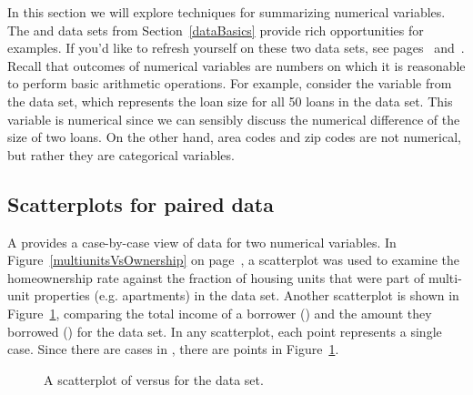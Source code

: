 In this section we will explore techniques for
summarizing numerical variables.
The  and  data sets from
Section~\ref{dataBasics} provide rich opportunities
for examples.
If you'd like to refresh yourself on these two data
sets, see pages~\pageref{loan50DF} and~\pageref{countyDF}.
Recall that outcomes of numerical variables are numbers
on which it is reasonable to perform basic arithmetic
operations.
For example, consider the
 variable
from the  data set,
which represents the loan size for all 50 loans
in the data set.
This variable is numerical since we can sensibly discuss
the numerical difference of the size of two loans.
On the other hand, area codes and zip codes are not numerical,
but rather they are categorical variables.


\subsection{Scatterplots for paired data}
\label{scatterPlots}


A  provides a case-by-case view of data
for two numerical variables.
In Figure~\vref{multiunitsVsOwnership} on
page~\pageref{multiunitsVsOwnership}, a scatterplot
was used to examine the homeownership rate against
the fraction of housing units that were part of
multi-unit properties
(e.g. apartments) in the  data set.
Another scatterplot is shown in Figure~\ref{loan50_amt_vs_income},
comparing the total income of a borrower
() and the amount they borrowed
() for the  data set.
In any scatterplot, each point represents a single case.
Since there are \loanN{} cases in ,
there are \loanN{} points in Figure~\ref{loan50_amt_vs_income}.


\begin{figure}[h]
  \centering
  \caption{A scatterplot of 
      versus  for the
       data set.}
  \label{loan50_amt_vs_income}
\end{figure}

